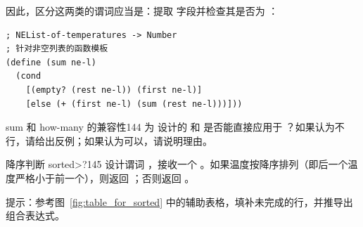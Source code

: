 因此，区分这两类的谓词应当是：提取  字段并检查其是否为 ：
\begin{lstlisting}[language=BSL]
; NEList-of-temperatures -> Number
; 针对非空列表的函数模板
(define (sum ne-l)
  (cond
    [(empty? (rest ne-l)) (first ne-l)]
    [else (+ (first ne-l) (sum (rest ne-l)))]))
\end{lstlisting}

\begin{exercise}{sum 和 how-many 的兼容性}{144}
为  设计的  和  是否能直接应用于 ？如果认为不行，请给出反例；如果认为可以，请说明理由。
\end{exercise}

\begin{exercise}{降序判断 sorted>?}{145}
设计谓词 ，接收一个 。如果温度按降序排列（即后一个温度严格小于前一个），则返回 ；否则返回 。

提示：参考图~\ref{fig:table_for_sorted} 中的辅助表格，填补未完成的行，并推导出组合表达式。
\end{exercise}

